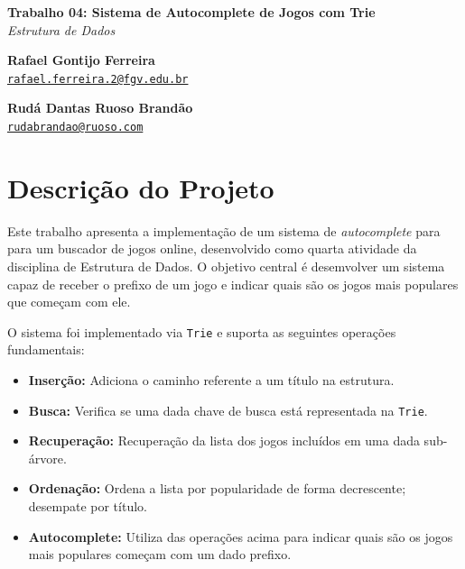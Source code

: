 \documentclass[11pt,a4paper]{article}
\begin{document}
\onehalfspacing
\begin{center}
    \vspace*{0.5cm}
    {\LARGE \textbf{Trabalho 04: Sistema de Autocomplete de Jogos com Trie}} \\
    \textit{Estrutura de Dados} \\
    \vspace{0.8cm}

    \begin{minipage}{0.45\textwidth}
        \centering
        \textbf{Rafael Gontijo Ferreira} \\
        \href{mailto:rafael.ferreira.2@fgv.edu.br}{\footnotesize \texttt{rafael.ferreira.2@fgv.edu.br}}
    \end{minipage}
    \begin{minipage}{0.45\textwidth}
        \centering
        \textbf{Rudá Dantas Ruoso Brandão} \\
        \href{mailto:rudabrandao@ruoso.com}{\footnotesize \texttt{rudabrandao@ruoso.com}}
    \end{minipage}
    
    \vspace{0.8cm}
\end{center}

\section{Descrição do Projeto}
 
Este trabalho apresenta a implementação de um sistema de \textit{autocomplete} para para um buscador de jogos online, desenvolvido como quarta atividade da disciplina de Estrutura de Dados. O objetivo central é desemvolver um sistema capaz de receber o prefixo de um jogo e indicar quais são os jogos mais populares que começam com ele.
 
O sistema foi implementado via \texttt{Trie} e suporta as seguintes operações fundamentais:
 
\begin{itemize}
    \item \textbf{Inserção:} Adiciona o caminho referente a um título na estrutura.
    \item \textbf{Busca:} Verifica se uma dada chave de busca está representada na \texttt{Trie}.
    \item \textbf{Recuperação:} Recuperação da lista dos jogos incluídos em uma dada sub-árvore.
    \item \textbf{Ordenação:} Ordena a lista por popularidade de forma decrescente; desempate por título.
    \item \textbf{Autocomplete:} Utiliza das operações acima para indicar quais são os jogos mais populares começam com um dado prefixo.
\end{itemize}
\end{document}
